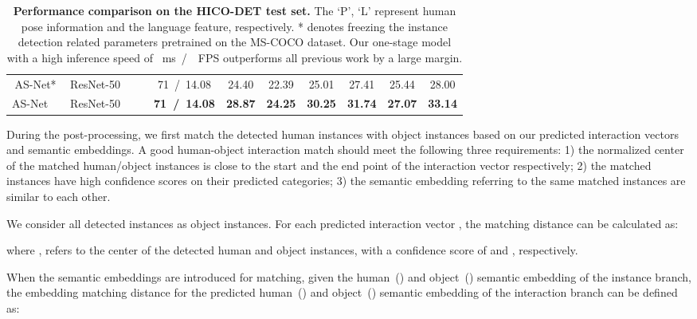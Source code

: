\documentclass[final]{cvpr}
\newcommand{\xmark}{\ding{55}}\newcommand{\cmark}{\ding{51}}
\begin{document}
\begin{table*}[htb!]
\begin{center}
{\begin{tabular}{ccccc|ccc|ccc}
\cellcolor{mygray-bg}AS-Net*		&\cellcolor{mygray-bg}ResNet-50		&\cellcolor{mygray-bg}\xmark&\cellcolor{mygray-bg}\xmark		&\cellcolor{mygray-bg}71~/~14.08	&\cellcolor{mygray-bg}24.40	&\cellcolor{mygray-bg}22.39	&\cellcolor{mygray-bg}25.01       &\cellcolor{mygray-bg}27.41 &\cellcolor{mygray-bg}25.44  &\cellcolor{mygray-bg}28.00\\
  \cellcolor{mygray-bg}AS-Net~~				&\cellcolor{mygray-bg}ResNet-50		&\cellcolor{mygray-bg}\cmark&\cellcolor{mygray-bg}\xmark		&\cellcolor{mygray-bg}\textbf{71~/~14.08}			&\cellcolor{mygray-bg}\textbf{28.87}	&\cellcolor{mygray-bg}\textbf{24.25} 	&\cellcolor{mygray-bg}\textbf{30.25}       &\cellcolor{mygray-bg}\textbf{31.74}	&\cellcolor{mygray-bg}\textbf{27.07}	&\cellcolor{mygray-bg}\textbf{33.14}\\
  \hline          
  \end{tabular}}
  \end{center}
   \vspace{-2mm}
    \caption{\textbf{Performance comparison on the HICO-DET test set.} The `P', `L' represent human pose information and the language feature, respectively. * denotes freezing the instance detection related parameters pretrained on the MS-COCO dataset. Our one-stage model with a high inference speed of ~ms~/~~FPS outperforms all previous work by a large margin.}
  \label{tb:hico}\vspace{-3mm}
  \end{table*}

During the post-processing, we first match the detected human instances with object instances based on our predicted interaction vectors and semantic embeddings. A good human-object interaction match should meet the following three requirements: 1) the normalized center of the matched human/object instances is close to the start and the end point of the interaction vector respectively; 2) the matched instances have high confidence scores on their predicted categories; 3) the semantic embedding referring to the same matched instances are similar to each other.

We consider all detected instances as object instances. For each predicted interaction vector , the matching distance  can be calculated as:

where ,  refers to the center of the detected human and object instances, with a confidence score of  and , respectively.

When the semantic embeddings are introduced for matching, given the human~() and object~() semantic embedding of the instance branch, the embedding matching distance  for the predicted human~() and object~() semantic embedding of the interaction branch can be defined as: 
\end{document}
